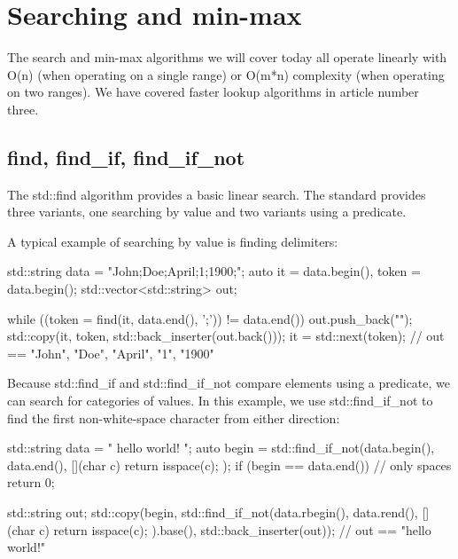 \section{Searching and min-max}

The search and min-max algorithms we will cover today all operate linearly with O(n) (when operating on a single range) or O(m*n) complexity (when operating on two ranges). We have covered faster lookup algorithms in article number three.

\subsection{find, find\_if, find\_if\_not}

The std::find algorithm provides a basic linear search. The standard provides three variants, one searching by value and two variants using a predicate.



A typical example of searching by value is finding delimiters:

\begin{box-note}
\begin{cppcode}
std::string data = "John;Doe;April;1;1900;";
auto it = data.begin(), token = data.begin();
std::vector<std::string> out;

while ((token = find(it, data.end(), ';')) != data.end()) {
    out.push_back("");
    std::copy(it, token, std::back_inserter(out.back()));
    it = std::next(token);
}
// out == { "John", "Doe", "April", "1", "1900" }
\end{cppcode}
\end{box-note}

Because std::find\_if and std::find\_if\_not compare elements using a predicate, we can search for categories of values. In this example, we use std::find\_if\_not to find the first non-white-space character from either direction:

\begin{box-note}
\begin{cppcode}
std::string data = "   hello world!  ";
auto begin = std::find_if_not(data.begin(), data.end(), 
                              [](char c) { return isspace(c); });
if (begin == data.end()) // only spaces
    return 0;

std::string out;
std::copy(begin, std::find_if_not(data.rbegin(), data.rend(), 
                                  [](char c) { return isspace(c); }).base(), 
          std::back_inserter(out));
// out == "hello world!"
\end{cppcode}
\end{box-note}

